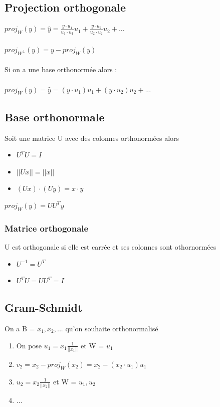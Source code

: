 \documentclass{article}
\begin{document}
\subsection{Projection orthogonale}
$proj_W(y) = \hat{y} = \frac{y \cdot u_1}{u_1 \cdot u_1}u_1 +  \frac{y \cdot u_2}{u_2 \cdot u_2}u_2 + ...$\\\\
$proj_{W^{\perp}}(y) = y - proj_W(y)$\\\\
Si on a une base orthonormée alors : \\\\
$proj_W(y) = \hat{y} = (y \cdot u_1)u_1 + (y \cdot u_2)u_2 + ...$

\subsection{Base orthonormale}
Soit une matrice U avec des colonnes orthonormées alors
\begin{itemize}
    \item $U^TU = I$
    \item $||Ux|| = ||x||$
    \item $(Ux) \cdot (Uy) = x \cdot y$
\end{itemize}
$proj_W(y) = UU^Ty$
\subsubsection{Matrice orthogonale}
U est orthogonale si elle est carrée et ses colonnes sont othornormées
\begin{itemize}
    \item $U^{-1} = U^T$
    \item $U^TU = UU^T = I$
\end{itemize}
\subsection{Gram-Schmidt}
On a B = {$x_1, x_2, ...$} qu'on souhaite orthonormalisé
\begin{enumerate}
    \item On pose $u_1 = x_1\frac{1}{||x_1||}$ et W = {$u_1$}
    \item $v_2 = x_2 - proj_W(x_2) = x_2 - (x_2 \cdot u_1)u_1$
    \item $u_2 = x_2\frac{1}{||x_2||}$ et W = {$u_1, u_2$}
    \item ...
\end{enumerate}
\end{document}

